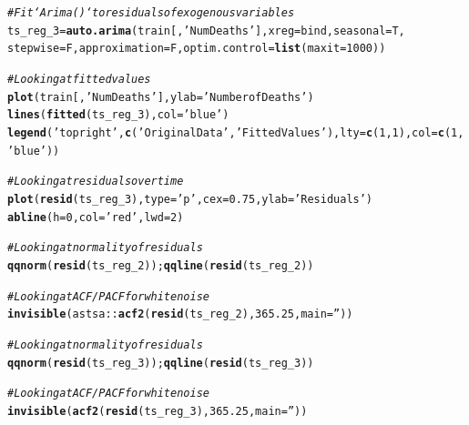 \documentclass{article}\usepackage[]{graphicx}\usepackage[]{color}
\makeatletter
\newcommand{\hlnum}[1]{\textcolor[rgb]{0.686,0.059,0.569}{#1}}%
\newcommand{\hlstr}[1]{\textcolor[rgb]{0.192,0.494,0.8}{#1}}%
\newcommand{\hlcom}[1]{\textcolor[rgb]{0.678,0.584,0.686}{\textit{#1}}}%
\newcommand{\hlopt}[1]{\textcolor[rgb]{0,0,0}{#1}}%
\newcommand{\hlstd}[1]{\textcolor[rgb]{0.345,0.345,0.345}{#1}}%
\newcommand{\hlkwb}[1]{\textcolor[rgb]{0.69,0.353,0.396}{#1}}%
\newcommand{\hlkwc}[1]{\textcolor[rgb]{0.333,0.667,0.333}{#1}}%
\newcommand{\hlkwd}[1]{\textcolor[rgb]{0.737,0.353,0.396}{\textbf{#1}}}%
\newenvironment{kframe}{%
 \def\at@end@of@kframe{}%
 \ifinner\ifhmode%
  \def\at@end@of@kframe{\end{minipage}}%
  \begin{minipage}{\columnwidth}%
 \fi\fi%
 \def\FrameCommand##1{\hskip\@totalleftmargin \hskip-\fboxsep
 \colorbox{shadecolor}{##1}\hskip-\fboxsep
     \hskip-\linewidth \hskip-\@totalleftmargin \hskip\columnwidth}%
 \MakeFramed {\advance\hsize-\width
   \@totalleftmargin\z@ \linewidth\hsize
   \@setminipage}}%
 {\par\unskip\endMakeFramed%
 \at@end@of@kframe}
\newenvironment{knitrout}{}{} %
\makeatother
\begin{document}
\begin{knitrout}
\color{fgcolor}\begin{kframe}
\begin{alltt}
\hlcom{# Fit `Arima()` to residuals of exogenous variables}
\hlstd{ts_reg_3} \hlkwb{=} \hlkwd{auto.arima}\hlstd{(train[,} \hlstr{'Num Deaths'}\hlstd{],} \hlkwc{xreg}\hlstd{=bind,} \hlkwc{seasonal}\hlstd{=T,}
  \hlkwc{stepwise}\hlstd{=F,} \hlkwc{approximation}\hlstd{=F,} \hlkwc{optim.control}\hlstd{=}\hlkwd{list}\hlstd{(}\hlkwc{maxit}\hlstd{=}\hlnum{1000}\hlstd{))}

\hlcom{# Looking at fitted values}
\hlkwd{plot}\hlstd{(train[,} \hlstr{'Num Deaths'}\hlstd{],} \hlkwc{ylab}\hlstd{=}\hlstr{'Number of Deaths'}\hlstd{)}
\hlkwd{lines}\hlstd{(}\hlkwd{fitted}\hlstd{(ts_reg_3),} \hlkwc{col}\hlstd{=}\hlstr{'blue'}\hlstd{)}
\hlkwd{legend}\hlstd{(}\hlstr{'topright'}\hlstd{,} \hlkwd{c}\hlstd{(}\hlstr{'Original Data'}\hlstd{,} \hlstr{'Fitted Values'}\hlstd{),} \hlkwc{lty}\hlstd{=}\hlkwd{c}\hlstd{(}\hlnum{1}\hlstd{,}\hlnum{1}\hlstd{),} \hlkwc{col}\hlstd{=}\hlkwd{c}\hlstd{(}\hlnum{1}\hlstd{,}\hlstr{'blue'}\hlstd{))}

\hlcom{# Looking at residuals over time}
\hlkwd{plot}\hlstd{(}\hlkwd{resid}\hlstd{(ts_reg_3),} \hlkwc{type}\hlstd{=}\hlstr{'p'}\hlstd{,} \hlkwc{cex}\hlstd{=}\hlnum{0.75}\hlstd{,} \hlkwc{ylab} \hlstd{=} \hlstr{'Residuals'}\hlstd{)}
\hlkwd{abline}\hlstd{(}\hlkwc{h}\hlstd{=}\hlnum{0}\hlstd{,} \hlkwc{col}\hlstd{=}\hlstr{'red'}\hlstd{,} \hlkwc{lwd}\hlstd{=}\hlnum{2}\hlstd{)}
\end{alltt}
\end{kframe}
\end{knitrout}
\begin{knitrout}
\color{fgcolor}\begin{kframe}
\begin{alltt}
\hlcom{# Looking at normality of residuals}
\hlkwd{qqnorm}\hlstd{(}\hlkwd{resid}\hlstd{(ts_reg_2));} \hlkwd{qqline}\hlstd{(}\hlkwd{resid}\hlstd{(ts_reg_2))}

\hlcom{# Looking at ACF/PACF for white noise}
\hlkwd{invisible}\hlstd{(astsa}\hlopt{::}\hlkwd{acf2}\hlstd{(}\hlkwd{resid}\hlstd{(ts_reg_2),} \hlnum{365.25}\hlstd{,} \hlkwc{main}\hlstd{=}\hlstr{''}\hlstd{))}
\end{alltt}
\end{kframe}
\end{knitrout}
\begin{knitrout}
\color{fgcolor}\begin{kframe}
\begin{alltt}
\hlcom{# Looking at normality of residuals}
\hlkwd{qqnorm}\hlstd{(}\hlkwd{resid}\hlstd{(ts_reg_3));} \hlkwd{qqline}\hlstd{(}\hlkwd{resid}\hlstd{(ts_reg_3))}

\hlcom{# Looking at ACF/PACF for white noise}
\hlkwd{invisible}\hlstd{(}\hlkwd{acf2}\hlstd{(}\hlkwd{resid}\hlstd{(ts_reg_3),} \hlnum{365.25}\hlstd{,} \hlkwc{main}\hlstd{=}\hlstr{''}\hlstd{))}
\end{alltt}
\end{kframe}
\end{knitrout}
\end{document}
